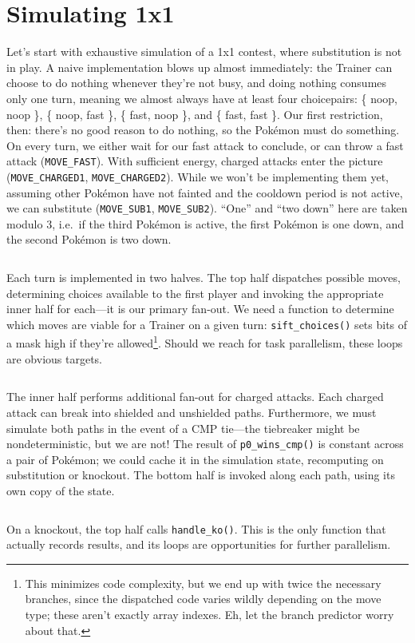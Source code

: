 \section{Simulating 1x1\label{sec:simul1x1}}
Let's start with exhaustive simulation of a 1x1 contest,
 where substitution is not in play.
A naive implementation blows up almost immediately: the Trainer can choose to do nothing
 whenever they're not busy, and doing nothing consumes only one turn,
 meaning we almost always have at least four choicepairs:
 \{ noop, noop \}, \{ noop, fast \}, \{ fast, noop \}, and \{ fast, fast \}.
Our first restriction, then: there's no good reason to do nothing,
 so the Pokémon must do something.
On every turn, we either wait for our fast attack to conclude, or can throw a fast attack (\texttt{MOVE\_FAST}).
With sufficient energy, charged attacks enter the picture (\texttt{MOVE\_CHARGED1}, \texttt{MOVE\_CHARGED2}).
While we won't be implementing them yet, assuming other Pokémon have not
  fainted and the cooldown period is not active, we can substitute (\texttt{MOVE\_SUB1}, \texttt{MOVE\_SUB2}).
``One'' and ``two down'' here are taken modulo 3, i.e.\ if the third Pokémon is
  active, the first Pokémon is one down, and the second Pokémon is two down.
\inputminted{cpp}{s/moves.h}
Each turn is implemented in two halves.
The top half dispatches possible moves, determining choices available to
 the first player and invoking the appropriate inner half for each---it is our primary fan-out.
We need a function to determine which moves are viable for a Trainer on a given turn:
 \texttt{sift\_choices()} sets bits of a mask high if they're allowed\footnote{This minimizes
  code complexity, but we end up with twice the necessary branches, since the dispatched
  code varies wildly depending on the move type; these aren't exactly array indexes.
  Eh, let the branch predictor worry about that.}.
Should we reach for task parallelism, these loops are obvious targets.
\inputminted{cpp}{s/sift.h}
The inner half performs additional fan-out for charged attacks.
Each charged attack can break into shielded and unshielded paths.
Furthermore, we must simulate both paths in the event of a CMP tie---the tiebreaker
 might be nondeterministic, but we are not!
The result of \texttt{p0\_wins\_cmp()} is constant across a pair of Pokémon;
 we could cache it in the simulation state, recomputing on substitution or knockout.
The bottom half is invoked along each path, using its own copy of the state.
\inputminted{cpp}{s/bottom.h}
On a knockout, the top half calls \texttt{handle\_ko()}.
This is the only function that actually records results, and its loops are opportunities for further parallelism.
